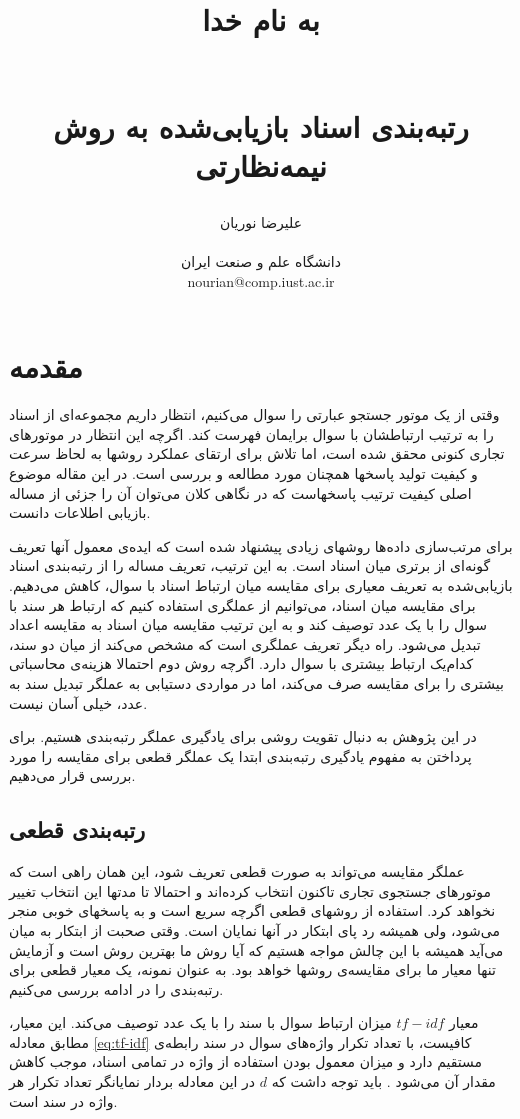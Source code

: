 \documentclass{article}
\title{ 
\begin{normalsize} به نام خدا \end{normalsize}
\\[2cm]
 رتبه‌بندی اسناد بازیابی‌شده به روش نیمه‌نظارتی
}
\author{علیرضا نوریان
\\
\\ \small دانشگاه علم و صنعت ایران
\\ \small nourian@comp.iust.ac.ir
}
\begin{document}
\maketitle

\section{مقدمه}
وقتی از یک موتور جستجو عبارتی را سوال می‌کنیم، انتظار داریم مجموعه‌ای از اسناد را به ترتیب ارتباطشان با سوال برایمان فهرست کند. اگرچه این انتظار در موتورهای تجاری کنونی محقق شده است، اما تلاش برای ارتقای عملکرد روشها به لحاظ سرعت و کیفیت تولید پاسخها همچنان مورد مطالعه و بررسی است. در این مقاله موضوع اصلی کیفیت ترتیب پاسخهاست که در نگاهی کلان می‌توان آن را جزئی از مساله بازیابی اطلاعات دانست.

برای مرتب‌سازی داده‌ها روشهای زیادی پیشنهاد شده است که ایده‌ی معمول آنها تعریف گونه‌ای از برتری میان اسناد است. به این ترتیب، تعریف مساله را از رتبه‌بندی اسناد بازیابی‌شده به تعریف معیاری برای مقایسه میان ارتباط اسناد با سوال، کاهش می‌دهیم. برای مقایسه میان اسناد، می‌توانیم از عملگری استفاده کنیم که ارتباط هر سند با سوال را با یک عدد توصیف کند و به این ترتیب مقایسه میان اسناد به مقایسه اعداد تبدیل می‌شود. راه دیگر تعریف عملگری است که مشخص می‌کند از میان دو سند، کدام‌یک ارتباط بیشتری با سوال دارد. اگرچه روش دوم احتمالا هزینه‌ی محاسباتی بیشتری را برای مقایسه صرف می‌کند، اما در مواردی دستیابی به عملگر تبدیل سند به عدد، خیلی آسان نیست.

در این پژوهش به دنبال تقویت روشی برای یادگیری عملگر رتبه‌بندی هستیم.  برای پرداختن به مفهوم یادگیری رتبه‌بندی ابتدا یک عملگر قطعی برای مقایسه را مورد بررسی قرار می‌دهیم.

\subsection{رتبه‌بندی قطعی}
عملگر مقایسه می‌تواند به صورت قطعی تعریف شود، این همان راهی است که موتورهای جستجوی تجاری تاکنون انتخاب کرده‌اند و احتمالا تا مدتها این انتخاب تغییر نخواهد کرد. استفاده از روشهای قطعی اگرچه سریع است و به پاسخهای خوبی منجر می‌شود، ولی همیشه رد پای ابتکار در آنها نمایان است. وقتی صحبت از ابتکار به میان می‌آید همیشه با این چالش مواجه هستیم که آیا روش ما بهترین روش است و آزمایش تنها معیار ما برای مقایسه‌ی روشها خواهد بود. به عنوان نمونه، یک معیار قطعی برای رتبه‌بندی را در ادامه بررسی می‌کنیم.

معیار $tf-idf$ میزان ارتباط سوال با سند را با یک عدد توصیف می‌کند. این معیار، مطابق معادله \ref{eq:tf-idf} کافیست، با تعداد تکرار واژه‌های سوال در سند رابطه‌ی مستقیم دارد و میزان معمول بودن استفاده از واژه در تمامی اسناد، موجب کاهش مقدار آن می‌شود \cite{tf-idf}. باید توجه داشت که $d$ در این معادله بردار نمایانگر تعداد تکرار هر واژه در سند است.
\end{document}
